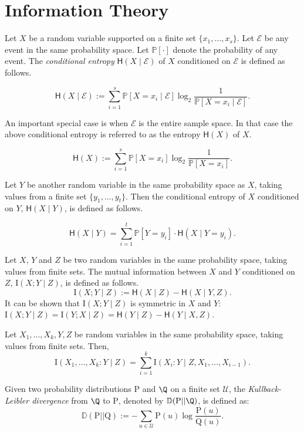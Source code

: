 \documentclass{toc}
\newcommand{\D}{\mathbb{D}}
\newcommand{\clU}{\mathcal{U}}
\newcommand{\rH}{\mathsf{H}}
\newcommand{\II}{\mathrm{I}}
\begin{document}
\section{Information Theory}
\label{infotheory}
Let $X$ be a random variable supported on a finite set $\{x_1, \ldots, x_s\}$. Let $\mathcal{E}$ be any event in the same probability space. Let $\mathbb{P}[\cdot]$ denote the probability of any event. The \emph{conditional entropy} $\rH(X \mid \mathcal{E})$ of $X$ conditioned on $\mathcal{E}$ is defined as follows.
\begin{definition}
	\[\rH(X \mid \mathcal{E}):=\sum_{i=1}^s \mathbb{P}[X=x_i \mid \mathcal{E}]\log_2 \frac{1}{\mathbb{P}[X=x_i \mid \mathcal{E}]}.\]
\end{definition}
An important special case is when $\mathcal{E}$ is the entire sample space. In that case the above conditional entropy is referred to as the entropy $\rH(X)$ of $X$.
\begin{definition}[Entropy]
	\[\rH(X):=\sum_{i=1}^s\mathbb{P}[X=x_i] \log_2 \frac{1}{\mathbb{P}[X=x_i]}.\]
\end{definition}
Let $Y$ be another random variable in the same probability space as $X$, taking values from a finite set $\{y_1, \ldots, y_t\}$. Then the conditional entropy of $X$ conditioned on $Y$, $\rH(X \mid Y)$, is defined as follows.
\begin{definition}
	\[\rH(X \mid Y)=\sum_{i=1}^t \mathbb{P}[Y=y_i] \cdot \rH(X \mid Y=y_i).\]
\end{definition}
\begin{definition}
	Let $X$, $Y$ and $Z$ be two random variables in the same probability space, taking values from finite sets. The mutual information between $X$ and $Y$ conditioned on $Z$, $\mathrm{I}(X;Y \mid Z)$, is defined as follows.
	\[\mathrm{I}(X;Y \mid Z):=\rH(X \mid Z)-\rH(X \mid Y, Z).\]
	It can be shown that $\mathrm{I}(X;Y \mid Z)$ is symmetric in $X$ and $Y$: $\mathrm{I}(X;Y \mid Z)=\mathrm{I}(Y;X \mid Z)=\rH(Y \mid Z)-\rH(Y \mid X, Z)$.
\end{definition}
\begin{theorem}
\label{chainrule}
Let $X_1, \ldots, X_k, Y, Z$ be random variables in the same probability space, taking values from finite sets. Then,
\[\II(X_1, \ldots, X_k:Y \mid Z)=\sum_{i=1}^k\II(X_i : Y \mid Z, X_1, \ldots, X_{i-1}).\]
\end{theorem}
\begin{definition}
\label{klpd}
Given two probability distributions $\text{P}$ and $\Q$ on a finite set $\clU$, the \emph{Kullback-Leibler %
divergence}   %
from $\Q$ to $\text{P}$, denoted by $\D(\text{P} || \Q)$, is defined as:
\[\D(\text{P} || \text{Q}):=-\sum_{u \in \clU}\text{P}(u) \log \frac{\text{P}(u)}{\text{Q}(u)}.\]
\end{definition}
\end{document}
